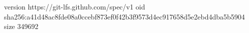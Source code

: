 version https://git-lfs.github.com/spec/v1
oid sha256:a41d48ac8fde08a0ccebf873ef0f42b3f9573d4ec917658d5e2ebd4dba5b5904
size 349692
